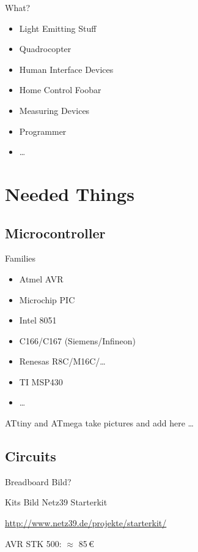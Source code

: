 \documentclass{beamer}
\begin{document}
\begin{frame}{What?}
    \begin{itemize}
        \item Light Emitting Stuff
        \item Quadrocopter
        \item Human Interface Devices
        \item Home Control Foobar
        \item Measuring Devices
        \item Programmer
        \item \dots
    \end{itemize}
\end{frame}

\section{Needed Things}

\subsection{Microcontroller}

\begin{frame}{Families}
    \begin{itemize}
        \item Atmel AVR
        \item Microchip PIC
        \item Intel 8051
        \item C166/C167 (Siemens/Infineon)
        \item Renesas R8C/M16C/…
        \item TI MSP430
        \item …
    \end{itemize}
\end{frame}

\begin{frame}{ATtiny and ATmega}
    take pictures and add here \dots
\end{frame}

\subsection{Circuits}

\begin{frame}{Breadboard}
    Bild?
\end{frame}

\begin{frame}{Kits}
    Bild Netz39 Starterkit

    \url{http://www.netz39.de/projekte/starterkit/}

    \pause
    AVR STK 500: $\approx$ 85\,€
\end{frame}
\end{document}

